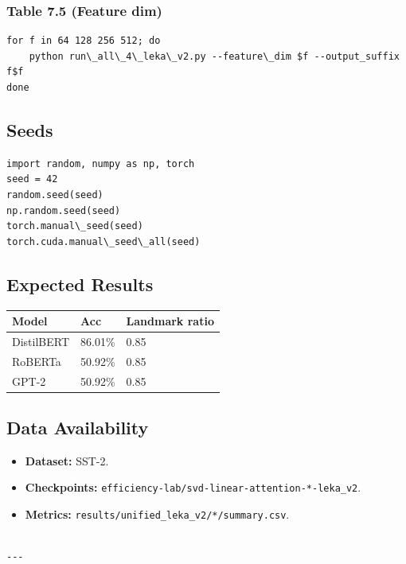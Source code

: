 \subsubsection{Table 7.5 (Feature dim)}
\begin{lstlisting}
for f in 64 128 256 512; do
    python run\_all\_4\_leka\_v2.py --feature\_dim $f --output_suffix f$f
done
\end{lstlisting}

\subsection{Seeds}

\begin{lstlisting}
import random, numpy as np, torch
seed = 42
random.seed(seed)
np.random.seed(seed)
torch.manual\_seed(seed)
torch.cuda.manual\_seed\_all(seed)
\end{lstlisting}

\subsection{Expected Results}

\begin{table}[H]
\centering
\small
\begin{tabular}{lll}
\toprule
\textbf{Model} & \textbf{Acc} & \textbf{Landmark ratio} \\
\midrule
DistilBERT & 86.01\% & 0.85 \\
RoBERTa & 50.92\% & 0.85 \\
GPT-2 & 50.92\% & 0.85 \\
\bottomrule
\end{tabular}
\end{table}

\subsection{Data Availability}

\begin{itemize}
\item \textbf{Dataset:} SST-2.
\item \textbf{Checkpoints:} \texttt{efficiency-lab/svd-linear-attention-*-leka\_v2}.
\item \textbf{Metrics:} \texttt{results/unified\_leka\_v2/*/summary.csv}.
\end{itemize}
\begin{lstlisting}

---
\end{lstlisting}

